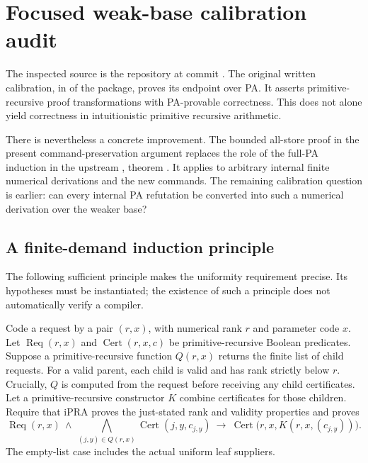 \section{Focused weak-base calibration audit}
\label{sec:focused-calibration-audit}

The inspected source is the repository at commit
.
The original written calibration, in
 of the
 package, proves its endpoint over
PA. It asserts primitive-recursive proof transformations with
PA-provable correctness. This does not alone yield correctness in
intuitionistic primitive recursive arithmetic.

There is nevertheless a concrete improvement. The bounded all-store
proof in the present command-preservation argument replaces the role of
the full-PA induction in the upstream
, theorem
. It applies to arbitrary internal finite
numerical derivations and the new commands. The remaining calibration
question is earlier: can every internal PA refutation be converted into
such a numerical derivation over the weaker base?

\subsection{A finite-demand induction principle}

The following sufficient principle makes the uniformity requirement
precise. Its hypotheses must be instantiated; the existence of such a
principle does not automatically verify a compiler.

Code a request by a pair $(r,x)$, with numerical rank $r$ and parameter
code $x$. Let $\operatorname{Req}(r,x)$ and
$\operatorname{Cert}(r,x,c)$ be primitive-recursive Boolean predicates.
Suppose a primitive-recursive function $Q(r,x)$ returns the finite list
of child requests. For a valid parent, each child is valid and has rank
strictly below $r$. Crucially, $Q$ is computed from the request before
receiving any child certificates. Let a primitive-recursive constructor
$K$ combine certificates for those children. Require that iPRA proves
the just-stated rank and validity properties and proves
\[
 \operatorname{Req}(r,x)\ \wedge\
 \bigwedge_{(j,y)\in Q(r,x)}
       \operatorname{Cert}(j,y,c_{j,y})
 \ \longrightarrow\
 \operatorname{Cert}\bigl(r,x,K(r,x,(c_{j,y}))\bigr).
\]
The empty-list case includes the actual uniform leaf suppliers.

